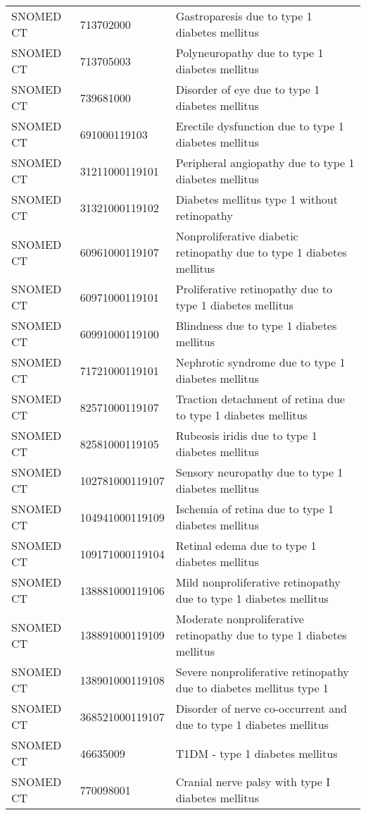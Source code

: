 \begin{longtable}{p{}p{}p{}}
  SNOMED CT & 713702000 & Gastroparesis due to type 1 diabetes mellitus \\ 
  SNOMED CT & 713705003 & Polyneuropathy due to type 1 diabetes mellitus \\ 
  SNOMED CT & 739681000 & Disorder of eye due to type 1 diabetes mellitus \\ 
  SNOMED CT & 691000119103 & Erectile dysfunction due to type 1 diabetes mellitus \\ 
  SNOMED CT & 31211000119101 & Peripheral angiopathy due to type 1 diabetes mellitus \\ 
  SNOMED CT & 31321000119102 & Diabetes mellitus type 1 without retinopathy \\ 
  SNOMED CT & 60961000119107 & Nonproliferative diabetic retinopathy due to type 1 diabetes mellitus \\ 
  SNOMED CT & 60971000119101 & Proliferative retinopathy due to type 1 diabetes mellitus \\ 
  SNOMED CT & 60991000119100 & Blindness due to type 1 diabetes mellitus \\ 
  SNOMED CT & 71721000119101 & Nephrotic syndrome due to type 1 diabetes mellitus \\ 
  SNOMED CT & 82571000119107 & Traction detachment of retina due to type 1 diabetes mellitus \\ 
  SNOMED CT & 82581000119105 & Rubeosis iridis due to type 1 diabetes mellitus \\ 
  SNOMED CT & 102781000119107 & Sensory neuropathy due to type 1 diabetes mellitus \\ 
  SNOMED CT & 104941000119109 & Ischemia of retina due to type 1 diabetes mellitus \\ 
  SNOMED CT & 109171000119104 & Retinal edema due to type 1 diabetes mellitus \\ 
  SNOMED CT & 138881000119106 & Mild nonproliferative retinopathy due to type 1 diabetes mellitus \\ 
  SNOMED CT & 138891000119109 & Moderate nonproliferative retinopathy due to type 1 diabetes mellitus \\ 
  SNOMED CT & 138901000119108 & Severe nonproliferative retinopathy due to diabetes mellitus type 1 \\ 
  SNOMED CT & 368521000119107 & Disorder of nerve co-occurrent and due to type 1 diabetes mellitus \\ 
  SNOMED CT & 46635009 & T1DM - type 1 diabetes mellitus \\ 
  SNOMED CT & 770098001 & Cranial nerve palsy with type I diabetes mellitus \\ 

\end{longtable}
